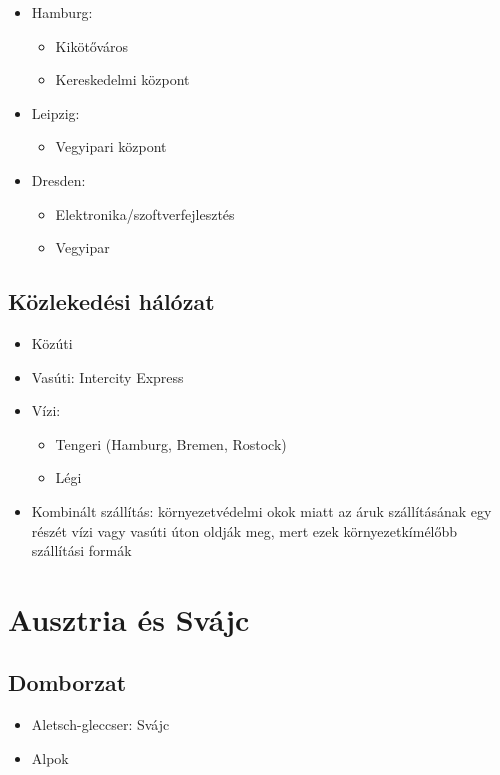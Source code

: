 \documentclass{article}
\begin{document}
\begin{itemize}
    \item Hamburg: \begin{itemize}
        \item Kikötőváros
        \item Kereskedelmi központ
    \end{itemize}

    \item Leipzig: \begin{itemize}
        \item Vegyipari központ
    \end{itemize}

    \item Dresden: \begin{itemize}
        \item Elektronika/szoftverfejlesztés
        \item Vegyipar
    \end{itemize}
\end{itemize}

\subsection{Közlekedési hálózat}
\begin{itemize}
    \item Közúti
    \item Vasúti: Intercity Express
    \item Vízi: \begin{itemize}
        \item Tengeri (Hamburg, Bremen, Rostock)
        \item Légi
    \end{itemize}

    \item Kombinált szállítás: környezetvédelmi okok miatt az áruk szállításának egy részét vízi vagy vasúti úton oldják meg, mert ezek környezetkímélőbb szállítási formák
\end{itemize}


\section{Ausztria és Svájc}

\subsection{Domborzat}
\begin{itemize}
    \item Aletsch-gleccser: Svájc
    \item Alpok
\end{itemize}
\end{document}
